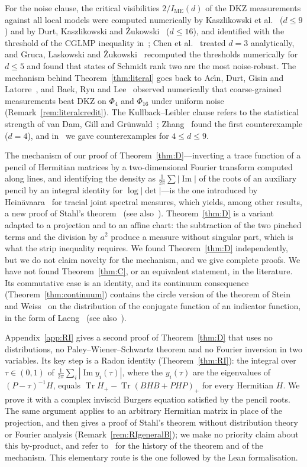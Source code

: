 \documentclass[11pt]{amsart}
\theoremstyle{definition}
\theoremstyle{remark}
\numberwithin{equation}{section}
\newcommand{\Tr}{\operatorname{Tr}}
\renewcommand{\Im}{\operatorname{Im}}
\newcommand{\IME}{I_{\mathrm{ME}}}
\begin{document}
For the noise clause, the critical visibilities $2/\IME(d)$ of the DKZ measurements against all local models were
computed numerically by Kaszlikowski et al.~\cite{KGZMZ} ($d\le9$) and by Durt, Kaszlikowski and
\.Zukowski~\cite{DKZ} ($d\le16$), and identified with the threshold of the CGLMP inequality in~\cite[eq.~(23)]{CGLMP};
Chen et al.~\cite{Chen01} treated $d=3$ analytically, and Gruca, Laskowski and \.Zukowski~\cite{GLZ} recomputed the
thresholds numerically for $d\le5$ and found that states of Schmidt rank two are the most noise-robust. The mechanism
behind Theorem~\ref{thm:literal} goes back to Ac\'{\i}n, Durt, Gisin and Latorre~\cite{ADGL}, and Baek, Ryu and
Lee~\cite{BRL} observed numerically that coarse-grained measurements beat DKZ on $\Phi_4$ and $\Phi_{16}$ under uniform
noise (Remark~\ref{rem:literalcredit}). The Kullback--Leibler clause refers to the statistical strength of van Dam, Gill
and Gr\"unwald~\cite{vDGG}; Zhang~\cite{Zhang} found the first counterexample ($d=4$), and in~\cite{repo-cglmp} we gave
counterexamples for $4\le d\le9$.

The mechanism of our proof of Theorem~\ref{thm:D}---inverting a trace function of a pencil of Hermitian matrices
by a two-dimensional Fourier transform computed along lines, and identifying the density as
$\frac1{2\pi}\sum|\Im|$ of the roots of an auxiliary pencil by an integral identity for $\log|\det|$---is the one
introduced by Hein\"avaara~\cite{He} for tracial joint spectral measures, which yields, among other
results, a new proof of Stahl's theorem~\cite{Stahl} (see also~\cite{Eremenko,LS}). Theorem~\ref{thm:D} is a variant
adapted to a projection and to an affine chart: the subtraction of the two pinched terms and the division by $a^2$
produce a measure without singular part, which is what the strip inequality requires. We found Theorem~\ref{thm:D}
independently, but we do not claim novelty for the mechanism, and we give complete proofs. We have not found
Theorem~\ref{thm:C}, or an equivalent statement, in the literature. Its commutative case is an identity, and its
continuum consequence (Theorem~\ref{thm:continuum}) contains the circle version of the theorem of Stein and
Weiss~\cite{SW} on the distribution of the conjugate function of an indicator function, in the form of
Laeng~\cite{Laeng} (see also~\cite{Boole,CLM}).

Appendix~\ref{app:RI} gives a second proof of Theorem~\ref{thm:D} that uses no distributions, no Paley--Wiener--Schwartz
theorem and no Fourier inversion in two variables. Its key step is a Radon identity (Theorem~\ref{thm:RI}): the integral over
$\tau\in(0,1)$ of $\frac1{2\pi}\sum_i|\Im y_i(\tau)|$, where the $y_i(\tau)$ are the eigenvalues of $(P-\tau)^{-1}H$, equals
$\Tr H_+-\Tr(BHB+PHP)_+$ for every Hermitian $H$. We prove it with a complex inviscid Burgers equation satisfied by the
pencil roots. The same argument applies to an arbitrary Hermitian matrix in place of the projection, and then gives a
proof of Stahl's theorem without distribution theory or Fourier analysis (Remark~\ref{rem:RIgeneralB}); we make no
priority claim about this by-product, and refer to~\cite{Stahl,Eremenko,He} for the history of the theorem and of the
mechanism. This elementary route is the one followed by the Lean formalisation.
\end{document}
